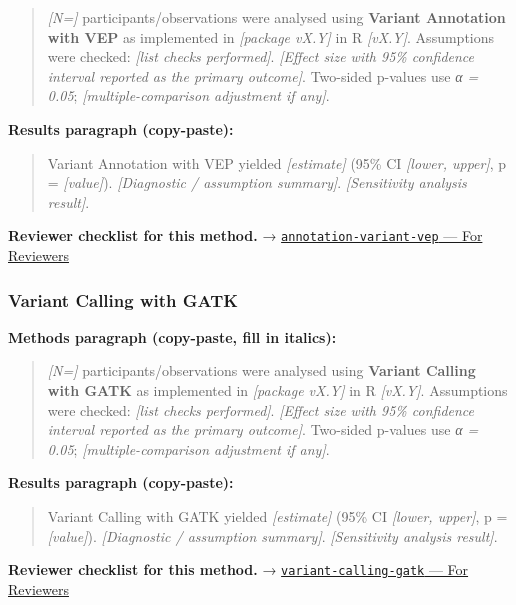 \documentclass[
]{article}
\begin{document}
\begin{quote}
\emph{{[}N={]}} participants/observations were analysed using
\textbf{Variant Annotation with VEP} as implemented in \emph{{[}package
vX.Y{]}} in R \emph{{[}vX.Y{]}}. Assumptions were checked: \emph{{[}list
checks performed{]}}. \emph{{[}Effect size with 95\% confidence interval
reported as the primary outcome{]}}. Two-sided p-values use \emph{α =
0.05}; \emph{{[}multiple-comparison adjustment if any{]}}.
\end{quote}

\textbf{Results paragraph (copy-paste):}

\begin{quote}
Variant Annotation with VEP yielded \emph{{[}estimate{]}} (95\% CI
\emph{{[}lower, upper{]}}, p = \emph{{[}value{]}}). \emph{{[}Diagnostic
/ assumption summary{]}}. \emph{{[}Sensitivity analysis result{]}}.
\end{quote}

\textbf{Reviewer checklist for this method.} →
\href{../chapters/12-bioinformatics/annotation-variant-vep.Rmd\#for-reviewers}{\texttt{annotation-variant-vep}
--- For Reviewers}

\subsubsection{Variant Calling with
GATK}\label{variant-calling-with-gatk}

\textbf{Methods paragraph (copy-paste, fill in italics):}

\begin{quote}
\emph{{[}N={]}} participants/observations were analysed using
\textbf{Variant Calling with GATK} as implemented in \emph{{[}package
vX.Y{]}} in R \emph{{[}vX.Y{]}}. Assumptions were checked: \emph{{[}list
checks performed{]}}. \emph{{[}Effect size with 95\% confidence interval
reported as the primary outcome{]}}. Two-sided p-values use \emph{α =
0.05}; \emph{{[}multiple-comparison adjustment if any{]}}.
\end{quote}

\textbf{Results paragraph (copy-paste):}

\begin{quote}
Variant Calling with GATK yielded \emph{{[}estimate{]}} (95\% CI
\emph{{[}lower, upper{]}}, p = \emph{{[}value{]}}). \emph{{[}Diagnostic
/ assumption summary{]}}. \emph{{[}Sensitivity analysis result{]}}.
\end{quote}

\textbf{Reviewer checklist for this method.} →
\href{../chapters/12-bioinformatics/variant-calling-gatk.Rmd\#for-reviewers}{\texttt{variant-calling-gatk}
--- For Reviewers}
\end{document}
